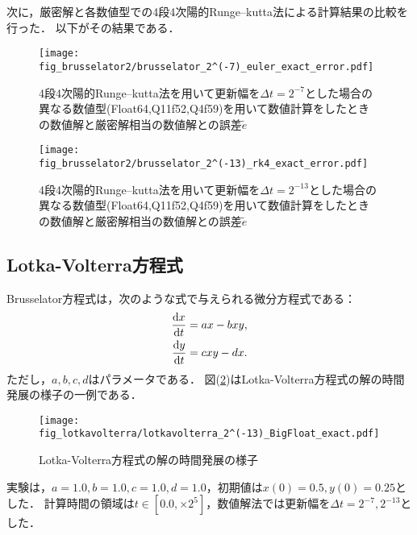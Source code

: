 次に，厳密解と各数値型での4段4次陽的Runge--kutta法による計算結果の比較を行った．
以下がその結果である．\\
\begin{figure}[H]
    \centering
    \begin{minipage}[b]{0.48\columnwidth}
        \centering
        \texttt{[image: fig\_brusselator2/brusselator\_2^(-7)\_euler\_exact\_error.pdf]}
        \caption{4段4次陽的Runge--kutta法を用いて更新幅を$\Delta t = 2^{-7}$とした場合の異なる数値型(Float64,Q11f52,Q4f59)を用いて数値計算をしたときの数値解と厳密解相当の数値解との誤差$\tilde{e}$}
        \label{fig:brusselator_2^(-7)_rk4_exact_error}
    \end{minipage}
    \hspace{0.01\columnwidth}
    \begin{minipage}[b]{0.48\columnwidth}
        \centering
        \texttt{[image: fig\_brusselator2/brusselator\_2^(-13)\_rk4\_exact\_error.pdf]}
        \caption{4段4次陽的Runge--kutta法を用いて更新幅を$\Delta t =  2^{-13}$とした場合の異なる数値型(Float64,Q11f52,Q4f59)を用いて数値計算をしたときの数値解と厳密解相当の数値解との誤差$\tilde{e}$}
        \label{fig:brusselator_2^(-13)_rk4_exact_error}
    \end{minipage}
\end{figure}

\subsection{Lotka-Volterra方程式}
Brusselator方程式は，次のような式で与えられる微分方程式である：
\begin{align}
    \frac{\mathrm{d}x}{\mathrm{d}t} &=  ax - bxy,\\
    \frac{\mathrm{d}y}{\mathrm{d}t} &= cxy - dx.
\end{align}
ただし，$a,b,c,d$はパラメータである．
図(\ref{fig:lotkavolterra})はLotka-Volterra方程式の解の時間発展の様子の一例である．
\begin{figure}[H]
    \centering
    \begin{minipage}[b]{0.9\columnwidth}
            \texttt{[image: fig\_lotkavolterra/lotkavolterra\_2^(-13)\_BigFloat\_exact.pdf]}
    \end{minipage}
    \caption{Lotka-Volterra方程式の解の時間発展の様子}
    \label{fig:lotkavolterra}
\end{figure}
実験は，$a=1.0, b=1.0, c=1.0, d=1.0$，初期値は$x(0) = 0.5, y(0) = 0.25$とした．
計算時間の領域は$t \in [0.0, \times 2^5]$，数値解法では更新幅を$\Delta t =  2^{-7}, 2^{-13}$とした．


